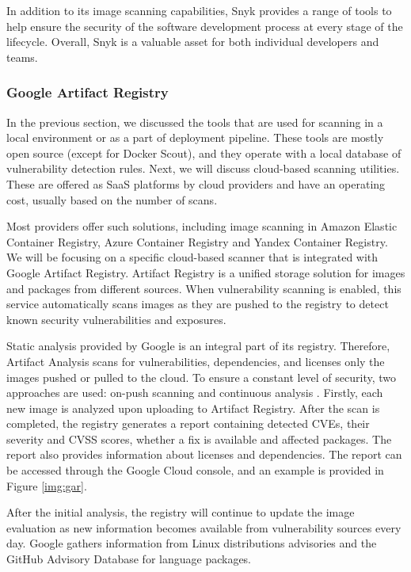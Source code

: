 In addition to its image scanning capabilities, Snyk provides a range of tools to help ensure the security of the software development process at every stage of the lifecycle. Overall, Snyk is a valuable asset for both individual developers and teams.

\subsubsection{Google Artifact Registry}

In the previous section, we discussed the tools that are used for scanning in a local environment or as a part of deployment pipeline. These tools are mostly open source (except for Docker Scout), and they operate with a local database of vulnerability detection rules. Next, we will discuss cloud-based scanning utilities. These are offered as SaaS platforms by cloud providers and have an operating cost, usually based on the number of scans. 

Most providers offer such solutions, including image scanning in Amazon Elastic Container Registry, Azure Container Registry and Yandex Container Registry. We will be focusing on a specific cloud-based scanner that is integrated with Google Artifact Registry. Artifact Registry is a unified storage solution for images and packages from different sources. When vulnerability scanning is enabled, this service automatically scans images as they are pushed to the registry to detect known security vulnerabilities and exposures.

Static analysis provided by Google is an integral part of its registry. Therefore, Artifact Analysis scans for vulnerabilities, dependencies, and licenses only the images pushed or pulled to the cloud. To ensure a constant level of security, two approaches are used: on-push scanning and continuous analysis \cite{d:gcp}. Firstly, each new image is analyzed upon uploading to Artifact Registry. After the scan is completed, the registry generates a report containing detected CVEs, their severity and CVSS scores, whether a fix is available and affected packages. The report also provides information about licenses and dependencies. The report can be accessed through the Google Cloud console, and an example is provided in Figure \ref{img:gar}.



After the initial analysis, the registry will continue to update the image evaluation as new information becomes available from vulnerability sources every day. Google gathers information from Linux distributions advisories and the GitHub Advisory Database for language packages.

